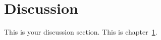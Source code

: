 \chapter{Discussion}
\label{ch:discussion}

This is your discussion section. This is chapter~\ref{ch:discussion}.